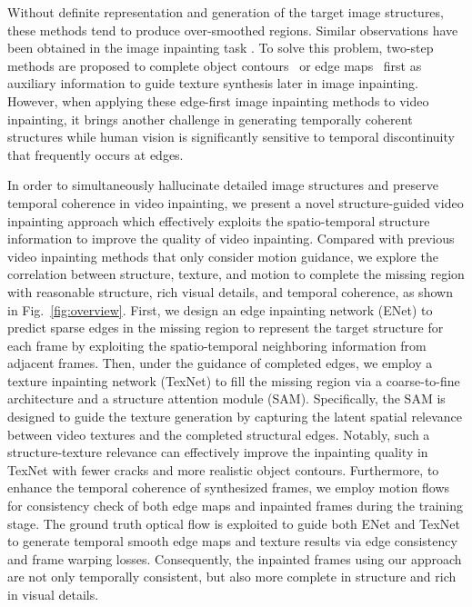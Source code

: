 Without definite representation and generation of the target image structures, these methods tend to produce over-smoothed regions. 
Similar observations have been obtained in the image inpainting task \cite{Xiong_2019_CVPR,nazeri2019edgeconnect}.
To solve this problem, two-step methods are proposed to complete object contours~\cite{Xiong_2019_CVPR} or edge maps~\cite{nazeri2019edgeconnect} first as auxiliary information to guide texture synthesis later in image inpainting.
%
However, when applying these edge-first image inpainting methods to video inpainting, it brings another challenge in generating temporally coherent structures while human vision is significantly sensitive to temporal discontinuity that frequently occurs at edges. 


In order to simultaneously hallucinate detailed image structures and preserve temporal coherence in video inpainting, we present a novel structure-guided video inpainting approach which effectively exploits the spatio-temporal structure information to improve the quality of video inpainting.  
%
Compared with previous video inpainting methods that only consider motion guidance, we explore the correlation between structure, texture, and motion to complete the missing region with reasonable structure, rich visual details, and temporal coherence, as shown in Fig.~\ref{fig:overview}.
First, we design an edge inpainting network (ENet) to predict sparse edges in the missing region to represent the target structure for each frame by exploiting the spatio-temporal neighboring information from adjacent frames.
Then, under the guidance of completed edges, we employ a texture inpainting network (TexNet) to fill the missing region via a coarse-to-fine architecture and a structure attention module (SAM).
Specifically, the SAM is designed to guide the texture generation by capturing the latent spatial relevance between video textures and the completed structural edges.
Notably, such a structure-texture relevance can effectively improve the inpainting quality in TexNet with fewer cracks and more realistic object contours.
Furthermore, to enhance the temporal coherence of synthesized frames, we employ motion flows for consistency check of both edge maps and inpainted frames during the training stage.
%
The ground truth optical flow is exploited to guide both ENet and TexNet to generate temporal smooth edge maps and texture results via edge consistency and frame warping losses.%
Consequently, the inpainted frames using our approach are not only temporally consistent, but also more complete in structure and rich in visual details.

